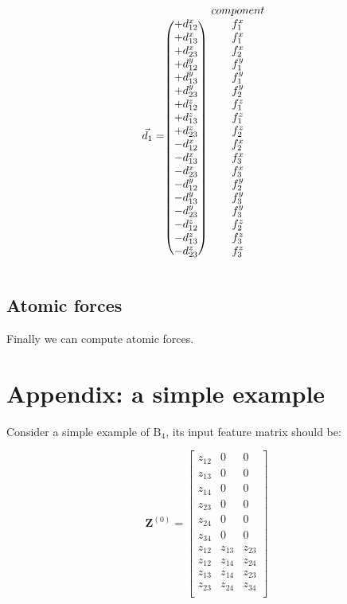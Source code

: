 \documentclass{article}
\begin{document}
\begin{equation}
\vec{d}_{1} = \begin{blockarray}{cc}
              & component \\
\begin{block}{(c)c}
	+d^x_{12} & f^x_1 \\
	+d^x_{13} & f^x_1 \\
	+d^x_{23} & f^x_2 \\
	+d^y_{12} & f^y_1 \\
	+d^y_{13} & f^y_1 \\
	+d^y_{23} & f^y_2 \\
	+d^z_{12} & f^z_1 \\
	+d^z_{13} & f^z_1 \\
	+d^z_{23} & f^z_2 \\
	-d^x_{12} & f^x_2 \\
	-d^x_{13} & f^x_3 \\
	-d^x_{23} & f^x_3 \\
	-d^y_{12} & f^y_2 \\
	-d^y_{13} & f^y_3 \\
	-d^y_{23} & f^y_3 \\
	-d^z_{12} & f^z_2 \\
	-d^z_{13} & f^z_3 \\
	-d^z_{23} & f^z_3 \\
\end{block}
\end{blockarray}
\end{equation}

\subsection{Atomic forces}

Finally we can compute atomic forces.


\section*{Appendix: a simple example}

Consider a simple example of $\mathrm{B}_{4}$, its input feature matrix should be:

\begin{equation}
\mathbf{Z}^{(0)} = \left[\begin{array}{ccc}
	z_{12} & 0        & 0        \\
	z_{13} & 0        & 0        \\
	z_{14} & 0        & 0        \\
	z_{23} & 0        & 0        \\
	z_{24} & 0        & 0        \\
	z_{34} & 0        & 0        \\
	z_{12} & z_{13} & z_{23} \\
	z_{12} & z_{14} & z_{24} \\
	z_{13} & z_{14} & z_{23} \\
	z_{23} & z_{24} & z_{34} \\
\end{array}
\right]
\end{equation}
\end{document}

